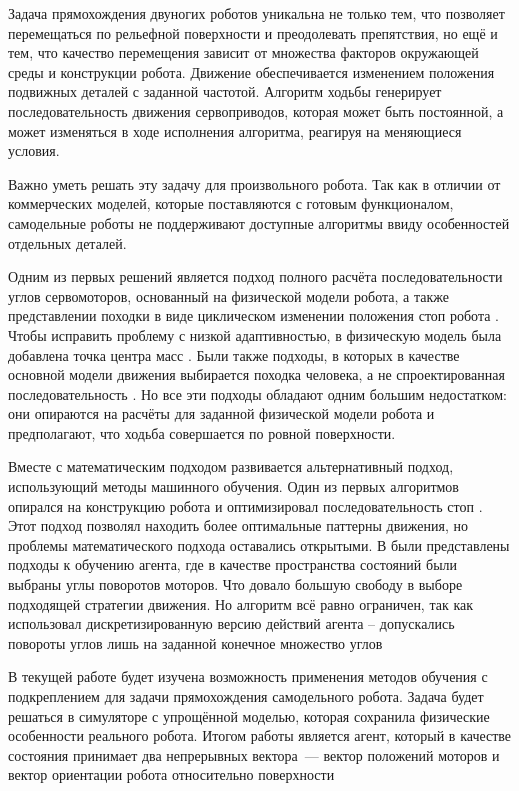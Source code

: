 
Задача прямохождения двуногих роботов уникальна не только тем, что позволяет перемещаться по рельефной поверхности и преодолевать препятствия, но ещё и тем, что качество перемещения зависит от множества факторов окружающей среды и конструкции робота. Движение обеспечивается изменением положения подвижных деталей с заданной частотой. Алгоритм ходьбы генерирует последовательность движения сервоприводов, которая может быть постоянной, а может изменяться в ходе исполнения алгоритма, реагируя на меняющиеся условия.

Важно уметь решать эту задачу для произвольного робота. Так как в отличии от коммерческих моделей, которые поставляются с готовым функционалом, самодельные роботы не поддерживают доступные алгоритмы ввиду особенностей отдельных деталей.

Одним из первых решений является подход полного расчёта последовательности углов сервомоторов, основанный на физической модели робота, а также представлении походки в виде циклическом изменении положения стоп робота \cite{inverse_1995}. Чтобы исправить проблему с низкой адаптивностью, в физическую модель была добавлена точка центра масс \cite{zmp_1999}. Были также подходы, в которых в качестве основной модели движения выбирается походка человека, а не спроектированная последовательность \cite{human_inspired}. Но все эти подходы обладают одним большим недостатком: они опираются на расчёты для заданной физической модели робота и предполагают, что ходьба совершается по ровной поверхности.

Вместе с математическим подходом развивается альтернативный подход, использующий методы машинного обучения. Один из первых алгоритмов опирался на конструкцию робота и оптимизировал последовательность стоп \cite{stochastic_2004}
. Этот подход позволял находить более оптимальные паттерны движения, но проблемы математического подхода оставались открытыми. В \cite{ml_in_bipedal_2012} были представлены подходы к обучению агента, где в качестве пространства состояний были выбраны углы поворотов моторов. Что довало большую свободу в выборе подходящей стратегии движения. Но алгоритм всё равно ограничен, так как использовал дискретизированную версию действий агента – допускались повороты углов лишь на заданной конечное множество углов

В текущей работе будет изучена возможность применения методов обучения с подкреплением для задачи прямохождения самодельного робота. Задача будет решаться в симуляторе с упрощённой моделью, которая сохранила физические особенности реального робота. Итогом работы является агент, который в качестве состояния принимает два непрерывных вектора~--- вектор положений моторов и вектор ориентации робота относительно поверхности